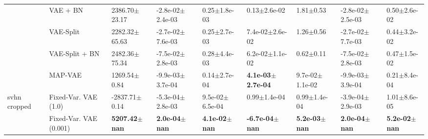 \begin{tabular}{lllllllll}
             & VAE + BN &            2386.70$\pm$23.17 &          -2.8e-02$\pm$2.4e-03 &              0.25$\pm$1.8e-03 &               0.13$\pm$2.6e-02 &                 1.81$\pm$0.53 &          -2.8e-02$\pm$2.5e-03 &              0.50$\pm$2.6e-02 \\
             & VAE-Split &            2282.32$\pm$65.63 &          -2.7e-02$\pm$7.6e-03 &              0.25$\pm$2.7e-03 &            7.4e-02$\pm$2.6e-02 &                 1.26$\pm$0.56 &          -2.7e-02$\pm$7.7e-03 &              0.44$\pm$3.2e-02 \\
             & VAE-Split + BN &            2482.36$\pm$75.34 &          -7.5e-02$\pm$2.8e-03 &              0.28$\pm$4.4e-03 &            6.2e-02$\pm$1.1e-02 &                 0.62$\pm$0.11 &          -7.5e-02$\pm$2.8e-03 &              0.47$\pm$1.5e-02 \\
             & MAP-VAE &             1269.54$\pm$0.84 &          -9.9e-03$\pm$3.7e-04 &              0.14$\pm$2.7e-04 &   \textbf{4.1e-03$\pm$2.7e-04} &           9.7e-02$\pm$1.1e-02 &          -9.9e-03$\pm$3.9e-04 &              0.21$\pm$8.4e-04 \\
svhn cropped & Fixed-Var. VAE (1.0) &            -2837.71$\pm$0.14 &          -5.3e-04$\pm$2.8e-03 &           9.5e-02$\pm$6.5e-04 &               0.99$\pm$1.4e-04 &              0.99$\pm$1.4e-04 &          -3.9e-04$\pm$2.9e-03 &              1.01$\pm$8.6e-05 \\
             & Fixed-Var. VAE (0.001) &     \textbf{5207.42$\pm$nan} &      \textbf{2.0e-04$\pm$nan} &      \textbf{4.1e-02$\pm$nan} &      \textbf{-6.7e-04$\pm$nan} &      \textbf{5.2e-03$\pm$nan} &      \textbf{2.0e-04$\pm$nan} &      \textbf{5.2e-02$\pm$nan} \\
\bottomrule
\end{tabular}

